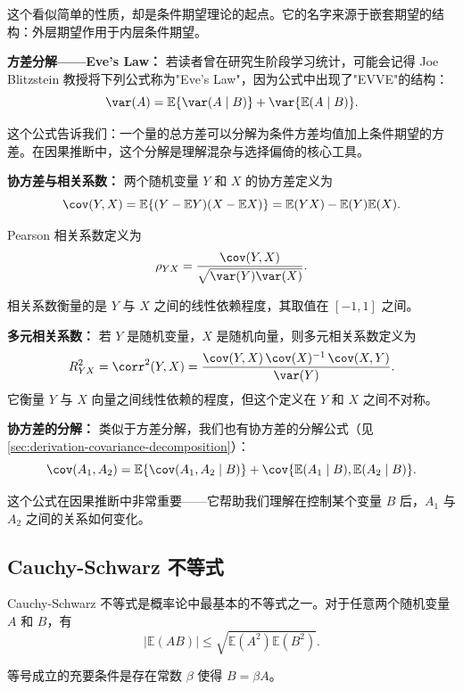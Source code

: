 这个看似简单的性质，却是条件期望理论的起点。它的名字来源于嵌套期望的结构：外层期望作用于内层条件期望。

\textbf{方差分解——Eve's Law：} 若读者曾在研究生阶段学习统计，可能会记得 Joe Blitzstein 教授将下列公式称为"Eve's Law"，因为公式中出现了"EVVE"的结构：
\begin{equation}\label{eq:eves-law}
\var(A) = \mathbb{E}\{\var(A \mid B)\} + \var\{\mathbb{E}(A \mid B)\}.
\end{equation}

这个公式告诉我们：一个量的总方差可以分解为条件方差均值加上条件期望的方差。在因果推断中，这个分解是理解混杂与选择偏倚的核心工具。

\textbf{协方差与相关系数：} 两个随机变量 $Y$ 和 $X$ 的协方差定义为
\[
\cov(Y, X) = \mathbb{E}\{(Y - \mathbb{E}Y)(X - \mathbb{E}X)\} = \mathbb{E}(YX) - \mathbb{E}(Y)\mathbb{E}(X).
\]

Pearson 相关系数定义为
\begin{equation}\label{eq:pearson-correlation}
\rho_{YX} = \frac{\cov(Y, X)}{\sqrt{\var(Y)\var(X)}} .
\end{equation}

相关系数衡量的是 $Y$ 与 $X$ 之间的线性依赖程度，其取值在 $[-1, 1]$ 之间。

\textbf{多元相关系数：} 若 $Y$ 是随机变量，$X$ 是随机向量，则多元相关系数定义为
\[
R_{YX}^2 = \corr^2(Y, X) = \frac{\cov(Y, X) \, \cov(X)^{-1} \, \cov(X, Y)}{\var(Y)} .
\]
它衡量 $Y$ 与 $X$ 向量之间线性依赖的程度，但这个定义在 $Y$ 和 $X$ 之间不对称。

\textbf{协方差的分解：} 类似于方差分解，我们也有协方差的分解公式（见 \cref{sec:derivation-covariance-decomposition}）：
\[
\cov(A_1, A_2) = \mathbb{E}\{\cov(A_1, A_2 \mid B)\} + \cov\{\mathbb{E}(A_1 \mid B), \mathbb{E}(A_2 \mid B)\}.
\]

这个公式在因果推断中非常重要——它帮助我们理解在控制某个变量 $B$ 后，$A_1$ 与 $A_2$ 之间的关系如何变化。

\subsection{Cauchy-Schwarz 不等式}

Cauchy-Schwarz 不等式是概率论中最基本的不等式之一。对于任意两个随机变量 $A$ 和 $B$，有
\begin{equation}\label{eq:cauchy-schwarz}
|\mathbb{E}(AB)| \leq \sqrt{\mathbb{E}(A^2)\mathbb{E}(B^2)} .
\end{equation}

等号成立的充要条件是存在常数 $\beta$ 使得 $B = \beta A$。

